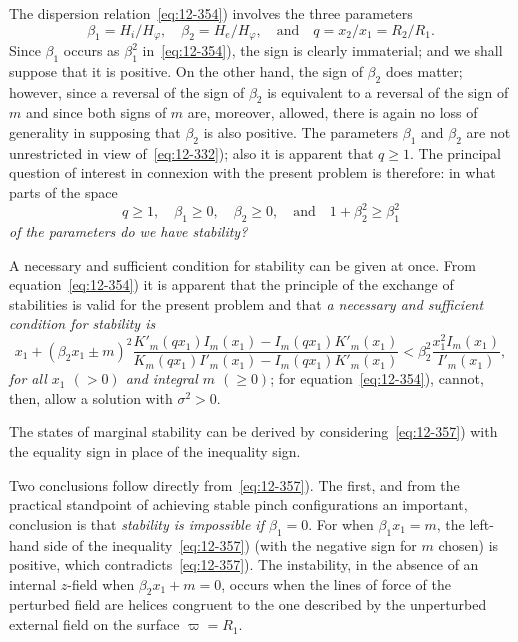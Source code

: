 The dispersion relation~\eqref{eq:12-354}) involves the three parameters
\begin{equation}
\label{eq:12-355}
\beta_1 = H_i/H_\varphi, \quad \beta_2 = H_e/H_\varphi, \quad \text{and} \quad q = x_2/x_1 = R_2/R_1.
\end{equation}
Since $\beta_1$ occurs as $\beta_1^2$ in~\eqref{eq:12-354}), the sign is clearly immaterial; and we shall suppose that it is positive. On the other hand, the sign of $\beta_2$ does matter; however, since a reversal of the sign of $\beta_2$ is equivalent to a reversal of the sign of $m$ and since both signs of $m$ are, moreover, allowed, there is again no loss of generality in supposing that $\beta_2$ is also positive. The parameters $\beta_1$ and $\beta_2$ are not unrestricted in view of~\eqref{eq:12-332}); also it is apparent that $q \geq 1$. The principal question of interest in connexion with the present problem is therefore: in what parts of the space
\begin{equation}
\label{eq:12-356}
q \geq 1, \quad \beta_1 \geq 0, \quad \beta_2 \geq 0, \quad \text{and} \quad 1+\beta_2^2 \geq \beta_1^2
\end{equation}
\emph{of the parameters do we have stability?}

A necessary and sufficient condition for stability can be given at once. From equation~\eqref{eq:12-354}) it is apparent that the principle of the exchange of stabilities is valid for the present problem and that \emph{a necessary and sufficient condition for stability is}
\begin{equation}
\label{eq:12-357}
x_1 + (\beta_2 x_1 \pm m)^2 \frac{K'_m(qx_1)I_m(x_1) - I_m(qx_1)K'_m(x_1)}{K_m(qx_1)I'_m(x_1) - I_m(qx_1)K'_m(x_1)} < \beta_2^2 \frac{x_1^2 I_m(x_1)}{I'_m(x_1)},
\end{equation}
\emph{for all $x_1$ $(> 0)$ and integral $m$ $(\geq 0)$}; for equation~\eqref{eq:12-354}), cannot, then, allow a solution with $\sigma^2 > 0$.

The states of marginal stability can be derived by considering~\eqref{eq:12-357}) with the equality sign in place of the inequality sign.

Two conclusions follow directly from~\eqref{eq:12-357}). The first, and from the practical standpoint of achieving stable pinch configurations an important, conclusion is that \emph{stability is impossible if $\beta_1 = 0$}. For when $\beta_1 x_1 = m$, the left-hand side of the inequality~\eqref{eq:12-357}) (with the negative sign for $m$ chosen) is positive, which contradicts~\eqref{eq:12-357}). The instability, in the absence of an internal $z$-field when $\beta_2 x_1 + m = 0$, occurs when the lines of force of the perturbed field are helices congruent to the one described by the unperturbed external field on the surface $\varpi = R_1$.

